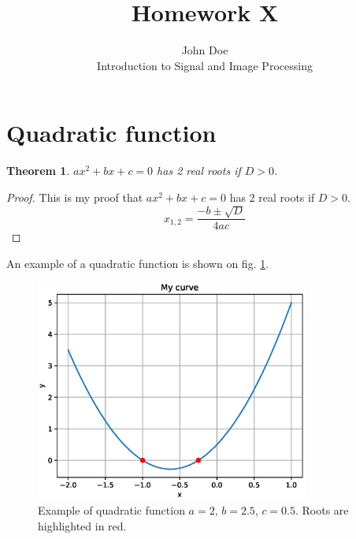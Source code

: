 \documentclass[12pt]{article}
\begin{document}


\title{Homework X}%
\author{John Doe\\ %
Introduction to Signal and Image Processing
}

\maketitle

\section{Quadratic function}
\newtheorem{thm}{Theorem}
\begin{thm}
$ax^2+bx+c=0$ has 2 real roots if $D>0$.
\end{thm}

\begin{proof}
This is my proof that $ax^2+bx+c=0$ has 2 real roots if $D>0$.
\[
x_{1,2}=\frac{-b\pm\sqrt{D}}{4ac}
\]
\end{proof}

An example of a quadratic function is shown on fig. \ref{fig:q1}.

\begin{figure}
\centering
\includegraphics[width=0.8\textwidth]{pics/q1}
\caption{Example of quadratic function $a=2$, $b=2.5$, $c=0.5$. Roots are highlighted in red.}
\label{fig:q1}
\end{figure}
\end{document}

